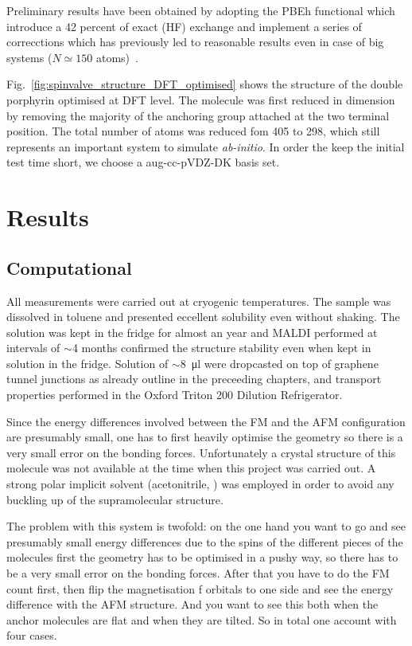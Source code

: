 Preliminary results have been obtained by adopting the PBEh functional which introduce a 42 percent of exact (HF) exchange and implement a series of correcctions which has previously led to reasonable results even in case of big systems ($N\simeq150$ atoms)~\cite{rohrdanz2009long, atalla2013hybrid}.

Fig.~\ref{fig:spinvalve_structure_DFT_optimised} shows the structure of the double porphyrin optimised at DFT level. The molecule was first reduced in dimension by removing the majority of the anchoring group attached at the two terminal position. The total number of atoms was reduced fom 405 to 298, which still represents an important system to simulate \textit{ab-initio}. In order the keep the initial test time short, we choose a aug-cc-pVDZ-DK basis set.

\section{Results}

\subsection{Computational}\label{sec:spinvalve:computational}
All measurements were carried out at cryogenic temperatures. The sample was dissolved in toluene and presented eccellent solubility even without shaking. The solution was kept in the fridge for almost an year and MALDI performed at intervals of $\sim$4 months confirmed the structure stability even when kept in solution in the fridge. Solution of $\sim$\SI{8}{\micro\litre} were dropcasted on top of graphene tunnel junctions as already outline in the preceeding chapters, and transport properties performed in the Oxford Triton 200 Dilution Refrigerator.

Since the energy differences involved between the FM and the AFM configuration are presumably small, one has to first heavily optimise the geometry so there is a very small error on the bonding forces. Unfortunately a crystal structure of this molecule was not available at the time when this project was carried out. A strong polar implicit solvent (acetonitrile, ) was employed in order to avoid any buckling up of the supramolecular structure.

The problem with this system is twofold: on the one hand you want to go and see presumably small energy differences due to the spins of the different pieces of the molecules first the geometry has to be optimised in a pushy way, so there has to be a very small error on the bonding forces. After that you have to do the FM count first, then flip the magnetisation f orbitals to one side and see the energy difference with the AFM structure. And you want to see this both when the anchor molecules are flat and when they are tilted. So in total one account with four cases.

